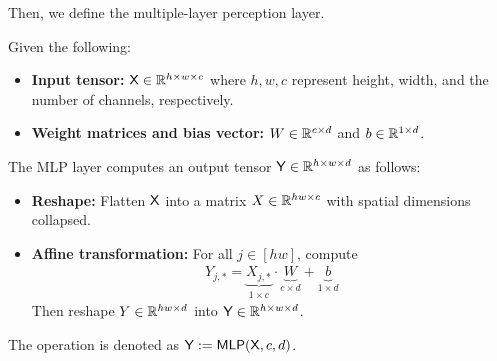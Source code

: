 Then, we define the multiple-layer perception layer.
\begin{definition}\label{def:mlp}
Given the following:
\begin{itemize}
    \item {\bf Input tensor:} $\mathsf{X} \in \mathbb{R}^{h \times w \times c}$ where $h,w,c$ represent height, width, and the number of channels, respectively.
    \item {\bf Weight matrices and bias vector:} $W \in \mathbb{R}^{c \times d}$ and $b \in \mathbb{R}^{1 \times d}$.
\end{itemize}
The MLP layer computes an output tensor $\mathsf{Y} \in \mathbb{R}^{h \times w \times d}$ as follows:
\begin{itemize}
    \item {\bf Reshape:} Flatten $\mathsf{X}$ into a matrix $X \in \mathbb{R}^{hw \times c}$ with spatial dimensions collapsed.
    \item {\bf Affine transformation:} For all $j \in [hw]$, compute
    \begin{align*}
        Y_{j,*} = \underbrace{X_{j,*}}_{1\times c} \cdot \underbrace{W}_{c \times d} + \underbrace{b}_{1 \times d}
    \end{align*}
    Then reshape $Y \in \mathbb{R}^{hw \times d}$ into $\mathsf{Y} \in \mathbb{R}^{h \times w \times d}$.
\end{itemize}
The operation is denoted as $\mathsf{Y} := \mathsf{MLP}(\mathsf{X},c,d)$.
\end{definition}


